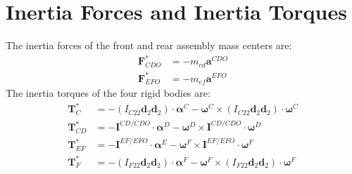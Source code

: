 \documentclass[letterpaper,11pt]{article}
\newcommand{\bs}[1]{ \boldsymbol{ #1 } }
\begin{document}
\section*{Inertia Forces and Inertia Torques}
\label{sec:inertia_forces}
The inertia forces of the front and rear assembly mass centers are:
\begin{align*}
  \bs{F}^*_{CDO} & = -m_{cd} \bs{a}^{CDO} \\
  \bs{F}^*_{EFO} & = -m_{ef} \bs{a}^{EFO}
\end{align*}
The inertia torques of the four rigid bodies are:
\begin{align*}
  \bs{T}^*_{C} & = - (I_{C22}\bs{d}_2 \bs{d}_2) \cdot \bs{\alpha}^C - \bs{\omega}^C \times
  (I_{C22}\bs{d}_2 \bs{d}_2) \cdot \bs{\omega}^C \\
  \bs{T}^*_{CD} & = - \bs{I}^{CD/CDO} \cdot \bs{\alpha}^D - \bs{\omega}^D \times
  \bs{I}^{CD/CDO} \cdot \bs{\omega}^D \\
  \bs{T}^*_{EF} & = - \bs{I}^{EF/EFO} \cdot \bs{\alpha}^E - \bs{\omega}^F \times
  \bs{I}^{EF/EFO} \cdot \bs{\omega}^F \\
  \bs{T}^*_{F} & = - (I_{F22}\bs{d}_2 \bs{d}_2) \cdot \bs{\alpha}^F - \bs{\omega}^F \times
  (I_{F22}\bs{d}_2 \bs{d}_2) \cdot \bs{\omega}^F \\
\end{align*}
\appendix
\end{document}
